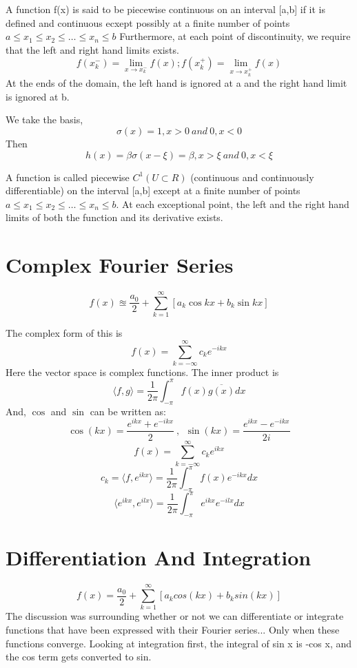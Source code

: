 \documentclass{article}
\begin{document}
\begin{definition}
   A function f(x) is said to be piecewise continuous on an interval [a,b] if it is defined and continuous ecxept possibly at a finite number of points $a\leq x_1 \leq x_2 \leq \dots \leq x_n \leq b$ Furthermore, at each point of discontinuity, we require that the left and right hand limits exists. 
   \[
      f(x_k^-) = \lim_{x \rightarrow x_k^-} f(x); f(x_k^+) = \lim_{x\rightarrow x_k^+} f(x)
   \]
   At the ends of the domain, the left hand is ignored at a and the right hand limit is ignored at b.
\end{definition}
We take the basis,
\[
   \sigma(x) = 1, x>0 \ and \ 0, x<0
\]
Then
\[
	h(x) = \beta \sigma(x - \xi) = \beta, x> \xi \ and \ 0, x<\xi
\]
\begin{definition}[Piecewise $C^1$]
   A function is called piecewise $C^1(U \subset R)$ (continuous and continuously differentiable) on the interval [a,b] except at a finite number of points $a\leq x_1 \leq x_2 \leq \dots \leq x_n \leq b$. At each exceptional point, the left and the right hand limits of both the function and its derivative exists.
\end{definition}
\section{Complex Fourier Series}
\[
   f(x) \approxeq \frac{a_0}{2}+\sum_{k=1}^{\infty}[a_k \cos{kx} + b_k \sin{kx}]
\]

The complex form of this is
\[
   f(x) = \sum_{k=-\infty}^{\infty} c_k e^{-ikx}
\]
Here the vector space is complex functions.
The inner product is 
\[
   \langle f,g \rangle = \frac{1}{2\pi}\int_{-\pi}^{\pi} f(x) \overline{g(x)} dx
\]
And, $\cos$ and $\sin$ can be written as:
\[
\cos{(kx)} = \frac{e^{ikx} + e^{-ikx}}{2} \ , \ \ \sin{(kx)} = \frac{e^{ikx} - e^{-ikx}}{2i}
\]
\[
   f(x) = \sum_{k=-\infty}^{\infty} c_k e^{ikx}
\]
\[
   c_k = \langle f, e^{ikx} \rangle = \frac{1}{2\pi} \int_{-\pi}^{\pi} f(x) e^{-ikx}dx
\]
\[
   \langle e^{ikx},e^{ilx} \rangle = \frac{1}{2\pi} \int_{-\pi}^\pi e^{ikx} e^{-ilx}dx
\]
\section{Differentiation And Integration} %
\[
   f(x) = \frac{a_0}{2} + \sum_{k=1}^{\infty} [a_k cos(kx) + b_k sin(kx)]
\]
The discussion was surrounding whether or not we can differentiate or integrate functions that have been expressed with their Fourier series... Only when these functions converge. 
Looking at integration first, the integral of sin x is -cos x, and the cos term gets converted to sin. 
\end{document}

